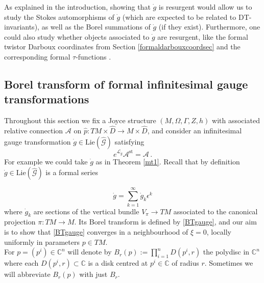 \documentclass{article}
\theoremstyle{definition}
\numberwithin{equation}{section}
\begin{document}
As explained in the introduction,  showing that $\dot{g}$ is resurgent would allow us to study the Stokes automorphisms of $\dot{g}$ (which are expected to be related to DT-invariants), as well as the Borel summations of $\dot{g}$ (if they exist). Furthermore, one could also study whether objects associated to $\dot{g}$ are resurgent, like the formal twistor Darboux coordinates from Section \ref{formaldarbouxcoordsec} and the corresponding formal $\tau$-functions \cite{BridgelandTau}.
\subsection{Borel transform of formal infinitesimal gauge transformations}\label{btgaugesec}

Throughout this section we fix a Joyce structure $(M,\Omega,\Gamma,Z,h)$ with associated relative connection $\mathcal{A}$ on $\widehat{p}:TM\times \widehat{D}\to M\times \widehat{D}$, and consider an infinitesimal gauge transformation $\dot{g}\in \text{Lie}(\widehat{\mathcal{G}})$ satisfying
\begin{equation*}
    e^{\mathcal{L}_{\dot{g}}}\mathcal{A}^{\text{st}}=\mathcal{A}\,.
\end{equation*}
For example we could take $\dot{g}$ as in Theorem \ref{mt1}. Recall that by definition $\dot{g}\in \text{Lie}(\widehat{\mathcal{G}})$ is a formal series

\begin{equation*}
    \dot{g}=\sum_{k=1}^{\infty}\dot{g}_k\epsilon^k
\end{equation*}
where $\dot{g}_k$ are sections of the vertical bundle $V_{\pi}\to TM$ associated to the canonical projection $\pi:TM \to M$. Its Borel transform is defined by \eqref{BTgauge}, and our aim is to show that \eqref{BTgauge} converges in a neighbourhood of $\xi=0$, locally uniformly in parameters $p\in TM$.\\

For $p=(p^i)\in \mathbb{C}^n$ will denote by $B_r(p):=\prod_{i=1}^{n}D(p^i,r)$ the polydisc in $\mathbb{C}^n$ where each $D(p^i,r)\subset \mathbb{C}$ is a disk centred at $p^i\in \mathbb{C}$ of radius $r$. Sometimes we will abbreviate $B_r(p)$ with just $B_r$.
\end{document}
